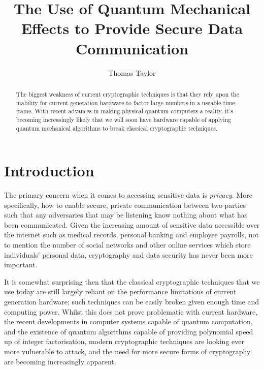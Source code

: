 \documentclass[runningheads,a4paper]{llncs}
\begin{document}
\mainmatter  

\title{The Use of Quantum Mechanical Effects to Provide Secure Data Communication}
\author{Thomas Taylor\\ \mail}

\maketitle

\begin{abstract}
The biggest weakness of current cryptographic techniques is that they rely upon the inability for current generation hardware to factor large numbers in a useable time-frame. With recent advances in making physical quantum computers a reality, it's becoming increasingly likely that we will soon have hardware capable of applying quantum mechanical algorithms to break classical cryptographic techniques.
\end{abstract}

\section{Introduction}

The primary concern when it comes to accessing sensitive data is \emph{privacy}. More specifically, how to enable secure, private communication between two parties such that any adversaries that may be listening know nothing about what has been communicated\cite{Rivest:1990fk}. Given the increasing amount of sensitive data accessible over the internet such as medical records, personal banking and employee payrolls, not to mention the number of social networks and other online services which store individuals' personal data, cryptography and data security has never been more important.

It is somewhat surprising then that the classical cryptographic techniques that we use today are still largely reliant on the performance limitations of current generation hardware; such techniques can be easily broken given enough time and computing power. Whilst this does not prove problematic with current hardware, the recent developments in computer systems capable of quantum computation, and the existence of quantum algorithms capable of providing polynomial speed up of integer factorisation\cite{Shor:1994fk}, modern cryptographic techniques are looking ever more vulnerable to attack, and the need for more secure forms of cryptography are becoming increasingly apparent.
\end{document}
